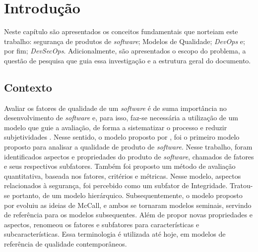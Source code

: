 \chapter[Introdução]{Introdução}

Neste capítulo são apresentados os conceitos fundamentais que norteiam este trabalho: segurança de produtos de \textit{software}; Modelos de Qualidade; \textit{DevOps} e; por fim; \textit{DevSecOps}. 
Adicionalmente, são apresentados o escopo do problema, a questão de pesquisa que guia essa investigação e a estrutura geral do documento.

\section{Contexto}

Avaliar os fatores de qualidade de um \textit{software} é de suma importância no desenvolvimento de \textit{software} e, para isso, faz-se necessária a utilização de um modelo que guie a avaliação, de forma a sistematizar o processo e reduzir subjetividades \cite{Siavvas21}. Nesse sentido, o modelo proposto por , foi o primeiro modelo proposto para analisar a qualidade de produto de \textit{software}. Nesse trabalho, foram identificados aspectos e propriedades do produto de \textit{software}, chamados de fatores e seus respectivos subfatores. Também foi proposto um método de avaliação quantitativa, baseada nos fatores, critérios e métricas. Nesse modelo, aspectos relacionados à segurança, foi percebido como um subfator de Integridade. Tratou-se portanto, de um modelo hierárquico. Subsequentemente, o modelo proposto por  evoluiu as ideias de McCall, e ambos se tornaram modelos seminais, servindo de referência para os modelos subsequentes. Além de propor novas propriedades e aspectos, renomeou os fatores e subfatores para características e subcaracterísticas. Essa terminologia é utilizada até hoje, em modelos de referência de qualidade contemporâneos.

